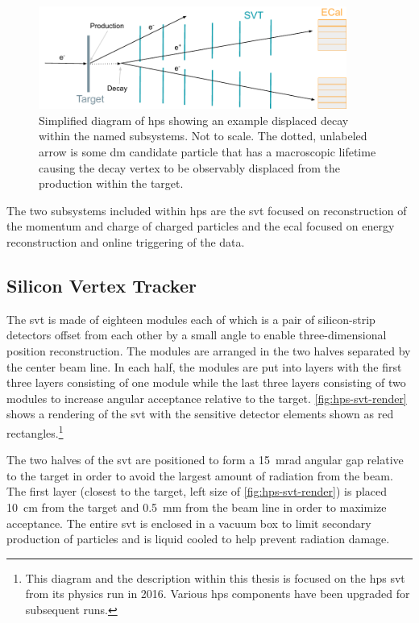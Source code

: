 \begin{figure}
	\centering
	\includegraphics[width=0.9\textwidth]{figures/hps/experiment/hps-diagram.pdf}
	\caption{
		Simplified diagram of \ac{hps} showing an example displaced decay within the named subsystems.
		Not to scale.
		The dotted, unlabeled arrow is some \ac{dm} candidate particle that has a macroscopic lifetime causing
		the decay vertex to be observably displaced from the production within the target.
	}
	\label{fig:hps-diagram}
\end{figure}

The two subsystems included within \ac{hps} are the \ac{svt} focused
on reconstruction of the momentum and charge of charged particles
and the \ac{ecal} focused on energy reconstruction and online triggering of the data.

\subsection{Silicon Vertex Tracker}
The \ac{svt} is made of eighteen modules each of which is a pair of silicon-strip detectors
offset from each other by a small angle to enable three-dimensional position reconstruction.
The modules are arranged in the two halves separated by the center beam line. In each half,
the modules are put into layers with the first three layers consisting of one module while
the last three layers consisting of two modules to increase angular acceptance relative
to the target. \cref{fig:hps-svt-render} shows a rendering of the \ac{svt} with the sensitive
detector elements shown as red rectangles.\footnote{
	This diagram and the description within this thesis is focused on the \ac{hps} \ac{svt}
	from its physics run in 2016. Various \ac{hps} components have been upgraded for
	subsequent runs.
}

The two halves of the \ac{svt} are positioned to form a \qty{15}{\milli\radian} angular gap relative
to the target in order to avoid the largest amount of radiation from the beam. The first layer
(closest to the target, left size of \cref{fig:hps-svt-render}) is placed \qty{10}{\cm} from
the target and \qty{0.5}{\mm} from the beam line in order to maximize acceptance. The entire
\ac{svt} is enclosed in a vacuum box to limit secondary production of particles and is liquid
cooled to help prevent radiation damage.

